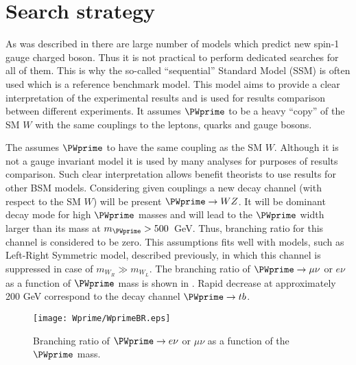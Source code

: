 


\section{Search strategy}
\label{sec:wprimeIntro}

As was described in  there are large number of models
which predict new spin-1 gauge charged boson. Thus it is not practical to perform
dedicated searches for all of them. This is why the so-called ``sequential'' Standard Model (SSM) is often used which is a reference benchmark model.
This model aims to provide a clear interpretation of the experimental results and
is used for results comparison between different experiments.
It assumes $\PWprime$ to be a heavy ``copy'' of the SM $W$ with the same couplings 
to the leptons, quarks and gauge bosons.

The  assumes $\PWprime$ to have the same
coupling as the SM $W$. Although it is not a gauge invariant model it is 
used by many analyses for purposes of results comparison.
Such clear interpretation allows benefit theorists to use results for other BSM models.
Considering given couplings a new decay channel (with respect to the SM $W$)
will be present $\PWprime \to WZ$. It will be dominant decay mode 
for high $\PWprime$ masses and will lead to the $\PWprime$ width larger
than its mass at  $m_{\PWprime} > 500$~GeV. Thus, branching ratio for
this channel is considered to be zero. This assumptions fits well with models, such as Left-Right Symmetric model, described previously, in which this channel is suppressed in case of $m_{W_R} \gg m_{W_L}$.
The branching ratio of $\PWprime \to \mu\nu$ or $e\nu$ as a function of $\PWprime$ mass
is shown in . Rapid decrease at approximately 200 GeV correspond to the decay channel $\PWprime \to tb$.
\begin{figure}[!htb]
  \centering
  \texttt{[image: Wprime/WprimeBR.eps]}
  \caption{Branching ratio of $\PWprime \rightarrow e\nu$ or $\mu\nu$ as a function of the $\PWprime$ mass.}
  \label{fig:wprimeBR}
\end{figure}


